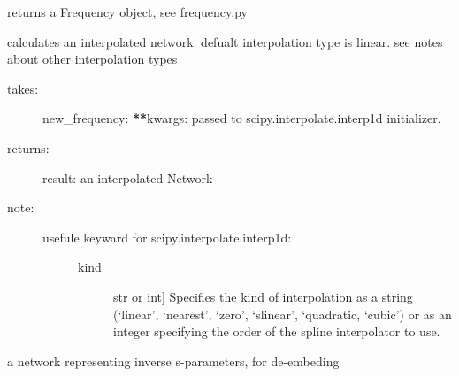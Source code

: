 \documentclass[letterpaper,10pt,english]{sphinxmanual}
\begin{document}
\begin{fulllineitems}
\begin{fulllineitems}
\end{fulllineitems}


\begin{fulllineitems}
\label{api/mwavepy:mwavepy.network.Network.frequency}
returns a Frequency object, see  frequency.py

\end{fulllineitems}


\begin{fulllineitems}
\label{api/mwavepy:mwavepy.network.Network.interpolate}
calculates an interpolated network. defualt interpolation type
is linear. see notes about other interpolation types
\begin{description}
\item[{takes:}] \leavevmode
new\_frequency:
{\color{red}\bfseries{}**}kwargs: passed to scipy.interpolate.interp1d initializer.

\item[{returns:}] \leavevmode
result: an interpolated Network

\item[{note:}] \leavevmode\begin{description}
\item[{usefule keyward for  scipy.interpolate.interp1d:}] \leavevmode\begin{description}
\item[{kind}] \leavevmode{[}str or int{]}
Specifies the kind of interpolation as a string (`linear',
`nearest', `zero', `slinear', `quadratic, `cubic') or as an integer
specifying the order of the spline interpolator to use.

\end{description}

\end{description}

\end{description}

\end{fulllineitems}


\begin{fulllineitems}
\label{api/mwavepy:mwavepy.network.Network.inv}
a network representing inverse s-parameters, for de-embeding


\end{fulllineitems}
\end{fulllineitems}
\end{document}
